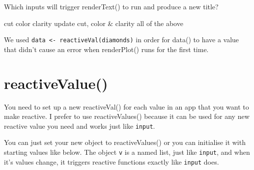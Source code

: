 \documentclass[
]{book}
\begin{document}
Which inputs will trigger renderText() to run and produce a new title?

cut color clarity update cut, color \& clarity all of the above

We used \texttt{data\ \textless{}-\ reactiveVal(diamonds)} in order for data() to have a value that didn't cause an error when renderPlot() runs for the first time.

\hypertarget{reactivevalue}{%
\section{reactiveValue()}\label{reactivevalue}}

You need to set up a new reactiveVal() for each value in an app that you want to make reactive. I prefer to use reactiveValues() because it can be used for any new reactive value you need and works just like \texttt{input}.

You can just set your new object to reactiveValues() or you can initialise it with starting values like below. The object \texttt{v} is a named list, just like \texttt{input}, and when it's values change, it triggers reactive functions exactly like \texttt{input} does.
\end{document}
